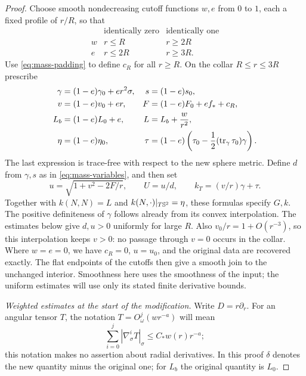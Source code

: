 \begin{proof}
Choose smooth nondecreasing cutoff functions $w,e$ from $0$ to $1$, each
a fixed profile of $r/R$, so that
\[
\begin{array}{c|cc}
 &\text{identically zero}&\text{identically one}\\ \hline
 w&r\leq R&r\geq2R\\
 e&r\leq2R&r\geq3R.
\end{array}
\]
Use \eqref{eq:mass-padding} to define $c_R$ for all $r\geq R$.  On the
collar $R\leq r\leq3R$ prescribe
\begin{equation}\label{eq:collar-data}
\begin{aligned}
 \gamma&=(1-e)\gamma_0+e r^2\sigma,&
 s&=(1-e)s_0,\\
 v&=(1-e)v_0+er,&
 F&=(1-e)F_0+ef_*+c_R,\\
 L_b&=(1-e)L_0+e,&
 L&=L_b+\frac{w}{r^2},\\
 \eta&=(1-e)\eta_0,&
 \tau&=(1-e)\left(\tau_0-
       \frac12(\operatorname{tr}_\gamma\tau_0)\gamma\right).
\end{aligned}
\end{equation}
The last expression is trace-free with respect to the new sphere metric.
Define $d$ from $\gamma,s$ as in \eqref{eq:mass-variables}, and then set
\begin{equation}\label{eq:collar-reconstruction}
 u=\sqrt{1+v^2-2F/r},\qquad U=u/d,\qquad
 k_T=(v/r)\gamma+\tau.
\end{equation}
Together with $k(N,N)=L$ and $k(N,\cdot)|_{T\mathbb S^2}=\eta$, these formulas
specify $G,k$. The positive definiteness of $\gamma$ follows already
from its convex interpolation. The estimates below give $d,u>0$
uniformly for large $R$. Also $v_0/r=1+O(r^{-3})$, so this interpolation
keeps $v>0$: no passage through $v=0$ occurs in the collar.
Where $w=e=0$, we have $c_R=0$, $u=u_0$, and the original data are
recovered exactly. The flat endpoints of the cutoffs then give a smooth
join to the unchanged interior. Smoothness here uses the smoothness
of the input; the uniform estimates will use only its stated finite
derivative bounds.

\medskip
\noindent\emph{Weighted estimates at the start of the modification.}
Write $D=r\partial_r$.  For an angular tensor $T$, the notation
$T=O^j_\omega(wr^{-a})$ will mean
\[
 \sum_{i=0}^j|\nabla_\sigma^iT|_\sigma\leq C_*w(r)r^{-a};
\]
this notation makes no assertion about radial derivatives.  In this
proof $\delta$ denotes the new quantity minus the original one; for
$L_b$ the original quantity is $L_0$.


\end{proof}
